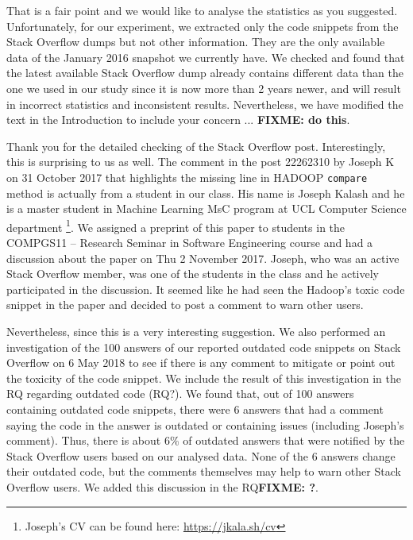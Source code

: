 \documentclass[a4paper,twoside,10pt]{reviewresponse}
\newcommand\FIXME[1]{{\color{red}\textbf{FIXME: #1}}}
\begin{document}
That is a fair point and we would like to analyse the statistics as you suggested. Unfortunately, for our experiment, we extracted only the code snippets from the Stack Overflow dumps but not other information. They are the only available data of the January 2016 snapshot we currently have. We checked and found that the latest available Stack Overflow dump already contains different data than the one we used in our study since it is now more than 2 years newer, and will result in incorrect statistics and inconsistent results. Nevertheless, we have modified the text in the Introduction to include your concern ... \FIXME{do this}.


Thank you for the detailed checking of the Stack Overflow post. Interestingly, this is surprising to us as well. The comment in the post 22262310 by Joseph K on 31 October 2017 that highlights the missing line in HADOOP \texttt{compare} method is actually from a student in our class. His name is Joseph Kalash and he is a master student in Machine Learning MsC program at UCL Computer Science department \footnote{Joseph's CV can be found here: \url{https://jkala.sh/cv}}. We assigned a preprint of this paper to students in the COMPGS11 -- Research Seminar in Software Engineering course and had a discussion about the paper on Thu 2 November 2017. Joseph, who was an active Stack Overflow member, was one of the students in the class and he actively participated in the discussion. It seemed like he had seen the Hadoop's toxic code snippet in the paper and decided to post a comment to warn other users.

Nevertheless, since this is a very interesting suggestion. We also performed an investigation of the 100 answers of our reported outdated code snippets on Stack Overflow on 6 May 2018 to see if there is any comment to mitigate or point out the toxicity of the code snippet. We include the result of this investigation in the RQ regarding outdated code (RQ?). We found that, out of 100 answers containing outdated code snippets, there were 6 answers that had a comment saying the code in the answer is outdated or containing issues (including Joseph's comment). Thus, there is about 6\% of outdated answers that were notified by the Stack Overflow users based on our analysed data. None of the 6 answers change their outdated code, but the comments themselves may help to warn other Stack Overflow users. We added this discussion in the RQ\FIXME{?}.
\end{document}
